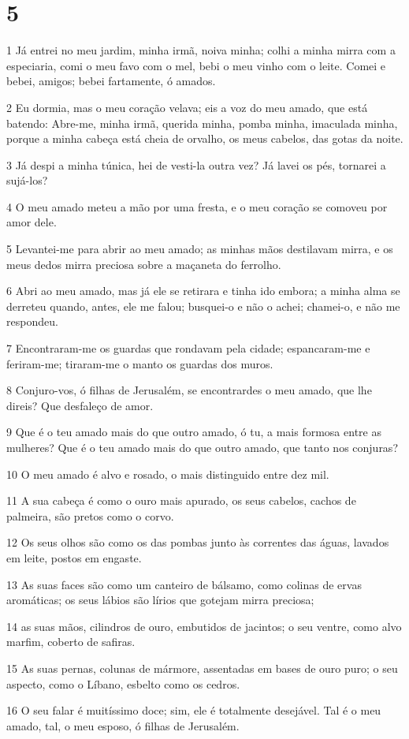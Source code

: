 \chapter{5}

\par 1 Já entrei no meu jardim, minha irmã, noiva minha; colhi a minha mirra com a especiaria, comi o meu favo com o mel, bebi o meu vinho com o leite. Comei e bebei, amigos; bebei fartamente, ó amados.
\par 2 Eu dormia, mas o meu coração velava; eis a voz do meu amado, que está batendo: Abre-me, minha irmã, querida minha, pomba minha, imaculada minha, porque a minha cabeça está cheia de orvalho, os meus cabelos, das gotas da noite.
\par 3 Já despi a minha túnica, hei de vesti-la outra vez? Já lavei os pés, tornarei a sujá-los?
\par 4 O meu amado meteu a mão por uma fresta, e o meu coração se comoveu por amor dele.
\par 5 Levantei-me para abrir ao meu amado; as minhas mãos destilavam mirra, e os meus dedos mirra preciosa sobre a maçaneta do ferrolho.
\par 6 Abri ao meu amado, mas já ele se retirara e tinha ido embora; a minha alma se derreteu quando, antes, ele me falou; busquei-o e não o achei; chamei-o, e não me respondeu.
\par 7 Encontraram-me os guardas que rondavam pela cidade; espancaram-me e feriram-me; tiraram-me o manto os guardas dos muros.
\par 8 Conjuro-vos, ó filhas de Jerusalém, se encontrardes o meu amado, que lhe direis? Que desfaleço de amor.
\par 9 Que é o teu amado mais do que outro amado, ó tu, a mais formosa entre as mulheres? Que é o teu amado mais do que outro amado, que tanto nos conjuras?
\par 10 O meu amado é alvo e rosado, o mais distinguido entre dez mil.
\par 11 A sua cabeça é como o ouro mais apurado, os seus cabelos, cachos de palmeira, são pretos como o corvo.
\par 12 Os seus olhos são como os das pombas junto às correntes das águas, lavados em leite, postos em engaste.
\par 13 As suas faces são como um canteiro de bálsamo, como colinas de ervas aromáticas; os seus lábios são lírios que gotejam mirra preciosa;
\par 14 as suas mãos, cilindros de ouro, embutidos de jacintos; o seu ventre, como alvo marfim, coberto de safiras.
\par 15 As suas pernas, colunas de mármore, assentadas em bases de ouro puro; o seu aspecto, como o Líbano, esbelto como os cedros.
\par 16 O seu falar é muitíssimo doce; sim, ele é totalmente desejável. Tal é o meu amado, tal, o meu esposo, ó filhas de Jerusalém.

